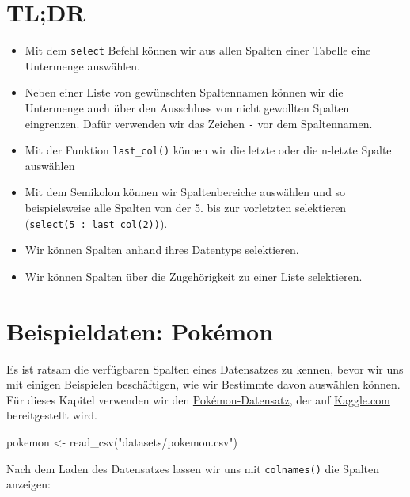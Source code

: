 \documentclass[
]{book}
\newenvironment{Shaded}{\begin{snugshade}}{\end{snugshade}}
\newcommand{\FunctionTok}[1]{\textcolor[rgb]{0.00,0.00,0.00}{#1}}
\newcommand{\NormalTok}[1]{#1}
\newcommand{\OtherTok}[1]{\textcolor[rgb]{0.56,0.35,0.01}{#1}}
\newcommand{\StringTok}[1]{\textcolor[rgb]{0.31,0.60,0.02}{#1}}
\providecommand{\tightlist}{%
  \setlength{\itemsep}{0pt}\setlength{\parskip}{0pt}}
\begin{document}
\hypertarget{tldr-3}{%
\section*{TL;DR}\label{tldr-3}}

\begin{itemize}
\tightlist
\item
  Mit dem \texttt{select} Befehl können wir aus allen Spalten einer Tabelle eine Untermenge auswählen.
\item
  Neben einer Liste von gewünschten Spaltennamen können wir die Untermenge auch über den Ausschluss von nicht gewollten Spalten eingrenzen. Dafür verwenden wir das Zeichen \texttt{-} vor dem Spaltennamen.
\item
  Mit der Funktion \texttt{last\_col()} können wir die letzte oder die n-letzte Spalte auswählen
\item
  Mit dem Semikolon können wir Spaltenbereiche auswählen und so beispielsweise alle Spalten von der 5. bis zur vorletzten selektieren (\texttt{select(5\ :\ last\_col(2))}).
\item
  Wir können Spalten anhand ihres Datentyps selektieren.
\item
  Wir können Spalten über die Zugehörigkeit zu einer Liste selektieren.
\end{itemize}

\hypertarget{beispieldaten-pokuxe9mon}{%
\section{Beispieldaten: Pokémon}\label{beispieldaten-pokuxe9mon}}

Es ist ratsam die verfügbaren Spalten eines Datensatzes zu kennen, bevor wir uns mit einigen Beispielen beschäftigen, wie wir Bestimmte davon auswählen können. Für dieses Kapitel verwenden wir den \href{https://www.kaggle.com/rounakbanik/pokemon/version/1}{Pokémon-Datensatz}, der auf \href{https://kaggle.com/}{Kaggle.com} bereitgestellt wird.

\begin{Shaded}
\begin{Highlighting}[]
\NormalTok{pokemon }\OtherTok{\textless{}{-}} \FunctionTok{read\_csv}\NormalTok{(}\StringTok{"datasets/pokemon.csv"}\NormalTok{)}
\end{Highlighting}
\end{Shaded}

Nach dem Laden des Datensatzes lassen wir uns mit \texttt{colnames()} die Spalten anzeigen:
\end{document}
